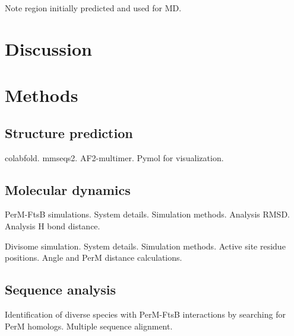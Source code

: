 \documentclass[pdflatex,sn-basic]{sn-jnl}%
\begin{document}

Note region initially predicted and used for MD.

\section{Discussion}

\loremipsum{}

\loremipsum{}

\loremipsum{}

\loremipsum{}




\section{Methods}

\subsection{Structure prediction}

colabfold.
mmseqs2.
AF2-multimer.
Pymol for visualization.

\loremipsum{}

\subsection{Molecular dynamics}

PerM-FtsB simulations.
System details.
Simulation methods.
Analysis RMSD.
Analysis H bond distance.

Divisome simulation. System details. Simulation methods. Active site residue positions. Angle and PerM distance calculations.

\loremipsum{}

\subsection{Sequence analysis}

Identification of diverse species with PerM-FtsB interactions by searching for PerM homologs.
Multiple sequence alignment.
\end{document}
